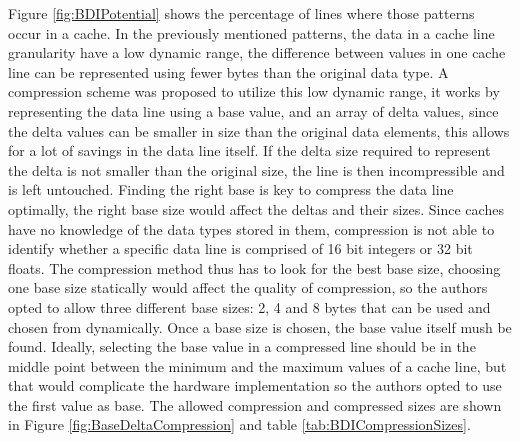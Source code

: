 Figure \ref{fig:BDIPotential} shows the percentage of lines where those patterns occur in a cache.
In the previously mentioned patterns, the data in a cache line granularity have a low dynamic range, the difference between values in one cache line can be represented using fewer bytes than the original data type. A compression scheme was proposed to utilize this low dynamic range, it works by representing the data line using a base value, and an array of delta values, since the delta values can be smaller in size than the original data elements, this allows for a lot of savings in the data line itself. If the delta size required to represent the delta is not smaller than the original size, the line is then incompressible and is left untouched.
Finding the right base is key to compress the data line optimally, the right base size would affect the deltas and their sizes. Since caches have no knowledge of the data types stored in them, compression is not able to identify whether a specific data line is comprised of 16 bit integers or 32 bit floats. The compression method thus has to look for the best base size, choosing one base size statically would affect the quality of compression, so the authors opted to allow three different base sizes: 2, 4 and 8 bytes that can be used and chosen from dynamically. Once a base size is chosen, the base value itself mush be found. Ideally, selecting the base value in a compressed line should be in the middle point between the minimum and the maximum values of a cache line, but that would complicate the hardware implementation so the authors opted to use the first value as base. The allowed compression and compressed sizes are shown in Figure \ref{fig:BaseDeltaCompression} and table \ref{tab:BDICompressionSizes}.
